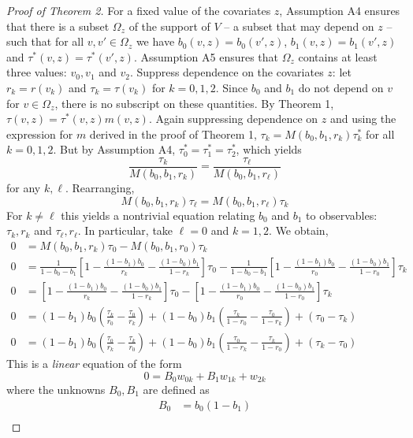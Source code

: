 \documentclass[12pt]{article}
\begin{document}
\begin{proof}[Proof of Theorem 2]
For a fixed value of the covariates $z$, Assumption A4 ensures that there is a subset  $\Omega_z$ of the support of $V$ -- a subset that may depend on $z$ -- such that for all $v, v' \in \Omega_z$ we have $b_0(v,z) = b_0(v',z)$, $b_1(v,z) = b_1(v',z)$ and $\tau^*(v,z) = \tau^*(v',z)$.
Assumption A5 ensures that $\Omega_z$ contains at least three values: $v_0, v_1$ and $v_2$.
Suppress dependence on the covariates $z$: let $r_k = r(v_k)$ and $\tau_k = \tau(v_k)$ for $k=0, 1, 2$.
Since $b_0$ and $b_1$ do not depend on $v$ for $v \in \Omega_z$, there is no subscript on these quantities.
By Theorem 1, $\tau(v,z) = \tau^*(v,z)m(v,z)$.
Again suppressing dependence on $z$ and using the expression for $m$ derived in the proof of Theorem 1,
  $\tau_k = M(b_0, b_1, r_k) \tau^*_k$
for all $k = 0, 1, 2$.
But by Assumption A4, $\tau^*_0 = \tau^*_1 = \tau^*_2$, which yields
\[
  \frac{\tau_k}{M(b_0, b_1, r_k)} = \frac{\tau_\ell}{M(b_0, b_1, r_\ell)}
\]
for any $k,\ell$.
Rearranging, 
\[
  M(b_0, b_1, r_k)\tau_\ell = M(b_0, b_1, r_\ell)\tau_k
\]
For $k \neq \ell$ this yields a nontrivial equation relating $b_0$ and $b_1$ to observables: $\tau_k, r_k$ and $\tau_\ell, r_\ell$.
In particular, take $\ell = 0$ and $k = 1, 2$.
We obtain,
\begin{align*}
  0 &= M(b_0, b_1, r_k)\tau_0 - M(b_0, b_1, r_0)\tau_k \\
  0 &= \frac{1}{1 - b_0 - b_1}\left[ 1 - \frac{(1 - b_1)b_0}{r_k} - \frac{(1-b_0)b_1}{1-r_k} \right]\tau_0 - \frac{1}{1 - b_0 - b_1}\left[ 1 - \frac{(1 - b_1)b_0}{r_0} - \frac{(1-b_0)b_1}{1-r_0} \right]\tau_k\\
  0 &= \left[ 1 - \frac{(1 - b_1)b_0}{r_k} - \frac{(1 - b_0)b_1}{1-r_k} \right]\tau_0 - \left[ 1 - \frac{(1 - b_1)b_0}{r_0} - \frac{(1 - b_0)b_1}{1-r_0} \right]\tau_k\\
  0 &= (1 - b_1)b_0 \left( \frac{\tau_k}{r_0} - \frac{\tau_0}{r_k} \right) + (1 - b_0)b_1 \left( \frac{\tau_k}{1 - r_0} - \frac{\tau_0}{1 - r_k} \right) + (\tau_0 - \tau_k)\\
  0 &= (1 - b_1)b_0 \left( \frac{\tau_0}{r_k} - \frac{\tau_k}{r_0} \right) + (1 - b_0)b_1 \left( \frac{\tau_0}{1 - r_k} - \frac{\tau_k}{1 - r_0} \right) + (\tau_k - \tau_0)
\end{align*}
This is a \emph{linear} equation of the form
\[
  0 = B_0 w_{0k} + B_1 w_{1k} + w_{2k}
\]
where the unknowns $B_0, B_1$ are defined as
\begin{align*}
  B_0 &= b_0 (1- b_1)\\

\end{align*}
\end{proof}
\end{document}
